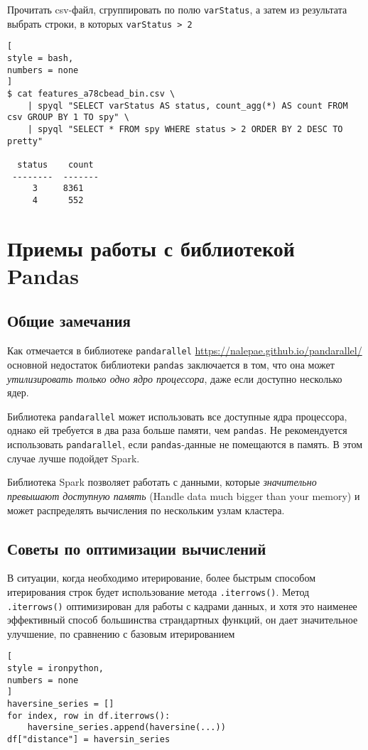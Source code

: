 \documentclass[%
	11pt,
	a4paper,
	utf8,
		]{article}
\begin{document}
Прочитать csv-файл, сгруппировать по полю \texttt{varStatus}, а затем из результата выбрать строки, в которых \texttt{varStatus > 2}
\begin{lstlisting}[
style = bash,
numbers = none
]
$ cat features_a78cbead_bin.csv \
    | spyql "SELECT varStatus AS status, count_agg(*) AS count FROM csv GROUP BY 1 TO spy" \
    | spyql "SELECT * FROM spy WHERE status > 2 ORDER BY 2 DESC TO pretty"
  
  status    count
 --------  -------
     3     8361
     4      552
\end{lstlisting}


\section{Приемы работы с библиотекой Pandas}

\subsection{Общие замечания}

Как отмечается в библиотеке \verb*|pandarallel| \url{https://nalepae.github.io/pandarallel/} основной недостаток библиотеки \verb|pandas| заключается в том, что она может \emph{\color{red}утилизировать только одно ядро процессора}, даже если доступно несколько ядер.

Библиотека \verb|pandarallel| может использовать все доступные ядра процессора, однако ей требуется в два раза больше памяти, чем \verb|pandas|. Не рекомендуется использовать \verb|pandarallel|, если \verb|pandas|-данные не помещаются в память. В этом случае лучше подойдет Spark.

Библиотека Spark позволяет работать с данными, которые \emph{значительно превышают доступную память} (Handle data much bigger than your memory) и может распределять вычисления по нескольким узлам кластера.

\subsection{Советы по оптимизации вычислений}

В ситуации, когда необходимо итерирование, более быстрым способом итерирования строк будет использование метода \texttt{.iterrows()}. Метод \texttt{.iterrows()} оптимизирован для работы с кадрами данных, и хотя это наименее эффективный способ большинства страндартных функций, он дает значительное улучшение, по сравнению с базовым итерированием \cite[]{heydt:pandas-2019}
\begin{lstlisting}[
style = ironpython,
numbers = none
]
haversine_series = []
for index, row in df.iterrows():
    haversine_series.append(haversine(...))
df["distance"] = haversin_series
\end{lstlisting}
\end{document}
